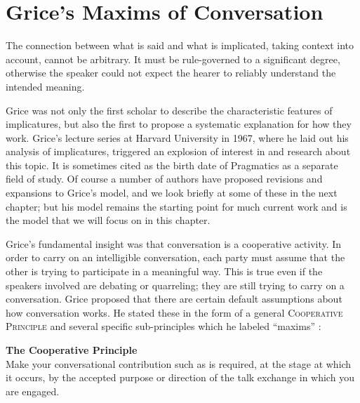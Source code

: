 \section{Grice’s Maxims of Conversation}\label{sec:} %

The connection between what is said and what is implicated, taking context into account, cannot be arbitrary. It must be rule-governed to a significant degree, otherwise the speaker could not expect the hearer to reliably understand the intended meaning.



Grice was not only the first scholar to describe the characteristic features of implicatures, but also the first to propose a systematic explanation for how they work. Grice’s lecture series at Harvard University in 1967, where he laid out his analysis of implicatures, triggered an explosion of interest in and research about this topic. It is sometimes cited as the birth date of Pragmatics as a separate field of study. Of course a number of authors have proposed revisions and expansions to Grice’s model, and we look briefly at some of these in the next chapter; but his model remains the starting point for much current work and is the model that we will focus on in this chapter.



Grice’s fundamental insight was that conversation is a cooperative activity. In order to carry on an intelligible conversation, each party must assume that the other is trying to participate in a meaningful way. This is true even if the speakers involved are debating or quarreling; they are still trying to carry on a conversation. Grice proposed that there are certain default assumptions about how conversation works. He stated these in the form of a general \textsc{Cooperative Principle}  and several specific sub-principles which he labeled “maxims” :


\begin{stylepoints} \label{ex:8.5}
\textbf{The Cooperative Principle} \citep[45]{Grice1975}\\
Make your conversational contribution such as is required, at the stage at which it occurs, by the accepted purpose or direction of the talk exchange in which you are engaged.
\end{stylepoints}

